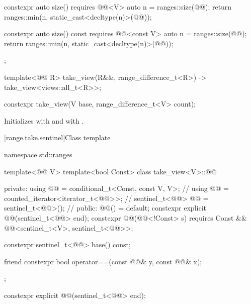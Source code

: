 \begin{codeblock}
{{    constexpr auto size() requires @@<V> {
      auto n = ranges::size(@@);
      return ranges::min(n, static_cast<decltype(n)>(@@));
    }

    constexpr auto size() const requires @@<const V> {
      auto n = ranges::size(@@);
      return ranges::min(n, static_cast<decltype(n)>(@@));
    }
  };

  template<@@ R>
    take_view(R&&, range_difference_t<R>)
      -> take_view<views::all_t<R>>;
}
\end{codeblock}

%
\begin{itemdecl}
constexpr take_view(V base, range_difference_t<V> count);
\end{itemdecl}

\begin{itemdescr}
\pnum
\effects
Initializes  with  and
 with .
\end{itemdescr}

[range.take.sentinel]{Class template }

%
\begin{codeblock}
namespace std::ranges {
  template<@@ V>
  template<bool Const>
  class take_view<V>::@@ {
  private:
    using @@ = conditional_t<Const, const V, V>;      // \expos
    using @@ = counted_iterator<iterator_t<@@>>;      // \expos
    sentinel_t<@@> @@ = sentinel_t<@@>();         // \expos
  public:
    @@() = default;
    constexpr explicit @@(sentinel_t<@@> end);
    constexpr @@(@@<!Const> s)
      requires Const && @@<sentinel_t<V>, sentinel_t<@@>>;

    constexpr sentinel_t<@@> base() const;

    friend constexpr bool operator==(const @@& y, const @@& x);
  };
}
\end{codeblock}

%
\begin{itemdecl}
constexpr explicit @@(sentinel_t<@@> end);
\end{itemdecl}

